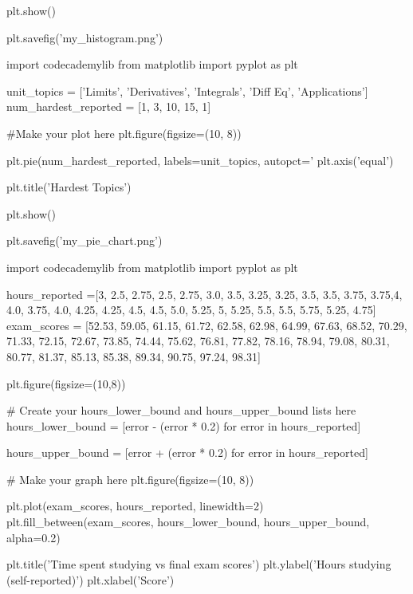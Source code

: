 \documentclass{journal}
\begin{document}
plt.show()

plt.savefig('my_histogram.png')
















import codecademylib
from matplotlib import pyplot as plt

unit_topics = ['Limits', 'Derivatives', 'Integrals', 'Diff Eq', 'Applications']
num_hardest_reported = [1, 3, 10, 15, 1]

#Make your plot here
plt.figure(figsize=(10, 8))

plt.pie(num_hardest_reported, labels=unit_topics, autopct='%
plt.axis('equal')

plt.title('Hardest Topics')

plt.show()

plt.savefig('my_pie_chart.png')














import codecademylib
from matplotlib import pyplot as plt

hours_reported =[3, 2.5, 2.75, 2.5, 2.75, 3.0, 3.5, 3.25, 3.25,  3.5, 3.5, 3.75, 3.75,4, 4.0, 3.75,  4.0, 4.25, 4.25, 4.5, 4.5, 5.0, 5.25, 5, 5.25, 5.5, 5.5, 5.75, 5.25, 4.75]
exam_scores = [52.53, 59.05, 61.15, 61.72, 62.58, 62.98, 64.99, 67.63, 68.52, 70.29, 71.33, 72.15, 72.67, 73.85, 74.44, 75.62, 76.81, 77.82, 78.16, 78.94, 79.08, 80.31, 80.77, 81.37, 85.13, 85.38, 89.34, 90.75, 97.24, 98.31]

plt.figure(figsize=(10,8))

# Create your hours_lower_bound and hours_upper_bound lists here 
hours_lower_bound = [error - (error * 0.2) for error in hours_reported]

hours_upper_bound = [error + (error * 0.2) for error in hours_reported]

# Make your graph here
plt.figure(figsize=(10, 8))

plt.plot(exam_scores, hours_reported, linewidth=2)
plt.fill_between(exam_scores, hours_lower_bound, hours_upper_bound, alpha=0.2)

plt.title('Time spent studying vs final exam scores')
plt.ylabel('Hours studying (self-reported)')
plt.xlabel('Score')
\end{document}
